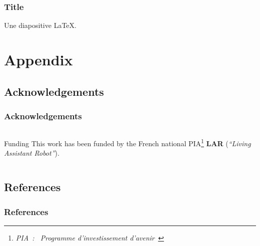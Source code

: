 \documentclass[10pt,c]{beamer}
\begin{document}
\begin{frame}
\frametitle{Title}
Une diapositive \LaTeX.
\end{frame}


\appendix


\section{Appendix}

\subsection{Acknowledgements}

\begin{frame}
\frametitle{Acknowledgements}
\begin{columns}[c]
\begin{column}{8.25cm}
\begin{block}{Funding}
This work has been funded by the French national PIA\footnote{\textsl{PIA~:
\guillemotleft~Programme d'investissement d'avenir~\guillemotright}}
\textbf{LAR} (\textit{``Living Assistant Robot''}).
\end{block}
\end{column}
\end{columns}
\end{frame}

\subsection{References}

\begin{frame}
\frametitle{References}


\end{frame}


\end{document}
